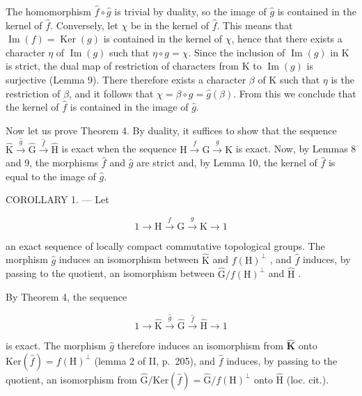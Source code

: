 The homomorphism \(\widehat{f} \circ \widehat{g}\) is trivial by duality, so the image of \(\widehat{g}\) is contained in the kernel of \(\widehat{f}\). Conversely, let \(\chi\) be in the kernel of \(\widehat{f}\). This means that \(\operatorname{Im}(f) = \operatorname{Ker}(g)\) is contained in the kernel of \(\chi\), hence that there exists a character \(\eta\) of \(\operatorname{Im}(g)\) such that \(\eta \circ g = \chi\). Since the inclusion of \(\operatorname{Im}(g)\) in K is strict, the dual map of restriction of characters from K to \(\operatorname{Im}(g)\) is surjective (Lemma 9). There therefore exists a character \(\beta\) of K such that \(\eta\) is the restriction of \(\beta\), and it follows that \(\chi = \beta \circ g = \widehat{g}(\beta)\). From this we conclude that the kernel of \(\widehat{f}\) is contained in the image of \(\widehat{g}\).

Now let us prove Theorem 4. By duality, it suffices to show that the sequence \(\widehat{\mathrm{K}}\xrightarrow{\widehat{g}}\widehat{\mathrm{G}}\xrightarrow{\widehat{f}}\widehat{\mathrm{H}}\) is exact when the sequence \(\mathrm{H}\xrightarrow{f}\mathrm{G}\xrightarrow{g}\mathrm{K}\) is exact. Now, by Lemmas 8 and 9, the morphisms \(\widehat{f}\) and \(\widehat{g}\) are strict and, by Lemma 10, the kernel of \(\widehat{f}\) is equal to the image of \(\widehat{g}\).

COROLLARY 1. --- Let

\[
1 \to \mathrm{H} \xrightarrow {f} \mathrm{G} \xrightarrow {g} \mathrm{K} \to 1
\]

an exact sequence of locally compact commutative topological groups. The morphism \(\widehat{g}\) induces an isomorphism between \(\widehat{\mathrm{K}}\) and \(f(\mathrm{H})^{\perp}\) , and \(\widehat{f}\) induces, by passing to the quotient, an isomorphism between \(\widehat{\mathrm{G}} / f(\mathrm{H})^{\perp}\) and \(\widehat{\mathrm{H}}\) .

By Theorem 4, the sequence

\[
1 \to \widehat {\mathrm{K}} \xrightarrow {\widehat {g}} \widehat {\mathrm{G}} \xrightarrow {\widehat {f}} \widehat {\mathrm{H}} \to 1\tag{32}
\]

is exact. The morphism \(\widehat{g}\) therefore induces an isomorphism from \(\widehat{\mathbf{K}}\) onto \(\mathrm{Ker}(\widehat{f}) = f(\mathrm{H})^{\perp}\) (lemma 2 of II, p.~205), and \(\widehat{f}\) induces, by passing to the quotient, an isomorphism from \(\widehat{\mathrm{G}} / \mathrm{Ker}(\widehat{f}) = \widehat{\mathrm{G}} / f(\mathrm{H})^{\perp}\) onto \(\widehat{\mathrm{H}}\) (loc. cit.).

